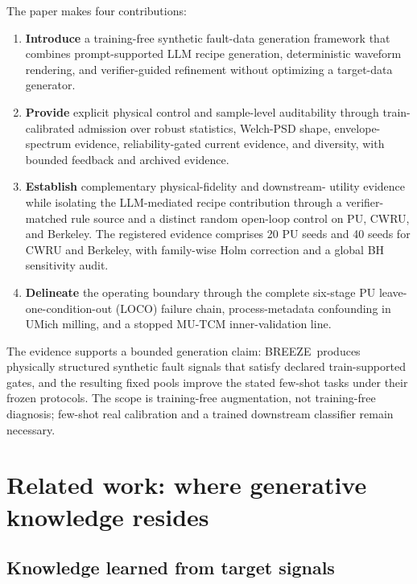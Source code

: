\documentclass[a4paper,fleqn]{cas-sc}
\newcommand{\breeze}{BREEZE}
\begin{document}
The paper makes four contributions:
\begin{enumerate}
  \item \textbf{Introduce} a training-free synthetic fault-data generation
  framework that combines prompt-supported LLM recipe generation,
  deterministic waveform rendering, and verifier-guided refinement without
  optimizing a target-data generator.
  \item \textbf{Provide} explicit physical control and sample-level
  auditability through train-calibrated admission over robust statistics,
  Welch-PSD shape, envelope-spectrum evidence, reliability-gated current
  evidence, and diversity, with bounded feedback and archived evidence.
  \item \textbf{Establish} complementary physical-fidelity and downstream-
  utility evidence while isolating the LLM-mediated recipe contribution through
  a verifier-matched rule source and a distinct random open-loop control on PU,
  CWRU, and Berkeley. The registered evidence comprises 20 PU seeds and 40
  seeds for CWRU and Berkeley, with family-wise Holm correction and a global BH
  sensitivity audit.
  \item \textbf{Delineate} the operating boundary through the complete six-stage
  PU leave-one-condition-out (LOCO) failure chain, process-metadata confounding
  in UMich milling, and a stopped MU-TCM inner-validation line.
\end{enumerate}

The evidence supports a bounded generation claim: \breeze\ produces physically
structured synthetic fault signals that satisfy declared train-supported gates,
and the resulting fixed pools improve the stated few-shot tasks under their
frozen protocols. The scope is training-free augmentation, not training-free
diagnosis; few-shot real calibration and a trained downstream classifier remain
necessary.

\section{Related work: where generative knowledge resides}
\label{sec:related}

\subsection{Knowledge learned from target signals}
\end{document}
